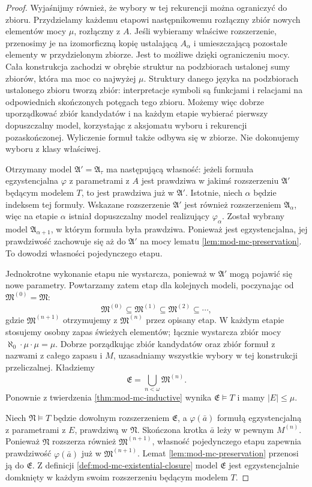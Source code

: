 \begin{proof}
Wyjaśnijmy również, że wybory w tej rekurencji
można ograniczyć do zbioru. Przydzielamy każdemu
etapowi następnikowemu rozłączny zbiór nowych
elementów mocy $\mu$, rozłączny z $A$.
Jeśli wybieramy właściwe rozszerzenie, przenosimy
je na izomorficzną kopię ustalającą $A_\alpha$
i umieszczającą pozostałe elementy w przydzielonym
zbiorze. Jest to możliwe dzięki ograniczeniu mocy.
Cała konstrukcja zachodzi w obrębie struktur
na podzbiorach ustalonej sumy zbiorów, która ma
moc co najwyżej $\mu$. Struktury danego języka
na podzbiorach ustalonego zbioru tworzą zbiór:
interpretacje symboli są funkcjami i relacjami
na odpowiednich skończonych potęgach tego zbioru.
Możemy więc dobrze uporządkować zbiór kandydatów
i na każdym etapie wybierać pierwszy dopuszczalny
model, korzystając z aksjomatu wyboru i rekurencji
pozaskończonej. Wyliczenie formuł także odbywa się
w zbiorze. Nie dokonujemy wyboru z klasy właściwej.

Otrzymany model $\mathfrak A'=\mathfrak A_\tau$
ma następującą własność: jeżeli formuła egzystencjalna
$\varphi$ z parametrami z $A$ jest prawdziwa
w jakimś rozszerzeniu $\mathfrak A'$ będącym modelem $T$,
to jest prawdziwa już w $\mathfrak A'$.
Istotnie, niech $\alpha$ będzie indeksem tej formuły.
Wskazane rozszerzenie $\mathfrak A'$ jest również
rozszerzeniem $\mathfrak A_\alpha$, więc na etapie
$\alpha$ istniał dopuszczalny model realizujący
$\varphi_\alpha$. Został wybrany model
$\mathfrak A_{\alpha+1}$, w którym formuła była
prawdziwa. Ponieważ jest egzystencjalna, jej
prawdziwość zachowuje się aż do $\mathfrak A'$
na mocy lematu \ref{lem:mod-mc-preservation}.
To dowodzi własności pojedynczego etapu.

Jednokrotne wykonanie etapu nie wystarcza, ponieważ
w $\mathfrak A'$ mogą pojawić się nowe parametry.
Powtarzamy zatem etap dla kolejnych modeli, poczynając
od $\mathfrak M^{(0)}=\mathfrak M$:
\[
\mathfrak M^{(0)}\subseteq\mathfrak M^{(1)}
\subseteq\mathfrak M^{(2)}\subseteq\cdots,
\]
gdzie $\mathfrak M^{(n+1)}$ otrzymujemy z
$\mathfrak M^{(n)}$ przez opisany etap. W każdym etapie
stosujemy osobny zapas świeżych elementów; łącznie
wystarcza zbiór mocy $\aleph_0\cdot\mu\cdot\mu=\mu$.
Dobrze porządkując zbiór kandydatów oraz zbiór
formuł z nazwami z całego zapasu i $M$, uzasadniamy
wszystkie wybory w tej konstrukcji przeliczalnej.
Kładziemy
\[
\mathfrak E=\bigcup_{n<\omega}\mathfrak M^{(n)}.
\]
Ponownie z twierdzenia \ref{thm:mod-mc-inductive}
wynika $\mathfrak E\models T$ i mamy $|E|\leq\mu$.

Niech $\mathfrak N\models T$ będzie dowolnym
rozszerzeniem $\mathfrak E$, a $\varphi(\bar a)$
formułą egzystencjalną z parametrami z $E$,
prawdziwą w $\mathfrak N$.
Skończona krotka $\bar a$ leży w pewnym
$M^{(n)}$. Ponieważ $\mathfrak N$ rozszerza również
$\mathfrak M^{(n+1)}$, własność pojedynczego etapu
zapewnia prawdziwość $\varphi(\bar a)$ już w
$\mathfrak M^{(n+1)}$. Lemat
\ref{lem:mod-mc-preservation} przenosi ją do
$\mathfrak E$. Z definicji
\ref{def:mod-mc-existential-closure} model
$\mathfrak E$ jest egzystencjalnie domknięty w
każdym swoim rozszerzeniu będącym modelem $T$.
\end{proof}

